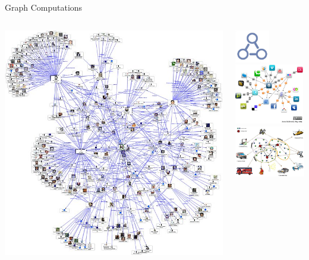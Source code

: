 \documentclass[onlymath,xcolor=pdftex,dvipsnames,table]{beamer}
\theoremstyle{remark} %
\begin{document}
\begin{frame}{Graph Computations}
\begin{columns}
  \begin{column}{.5\textwidth}
    \includegraphics[width=\columnwidth]{socialnet.jpg}
  \end{column}
  \begin{column}{.5\textwidth}
    \includegraphics[width=1.5cm]{graphsearch.jpg}~~
    \includegraphics[width=3cm]{webgraph.jpg}\\
    \includegraphics[width=4cm]{sensornet.jpg}
  \end{column}
\end{columns}
\end{frame}
\end{document}
